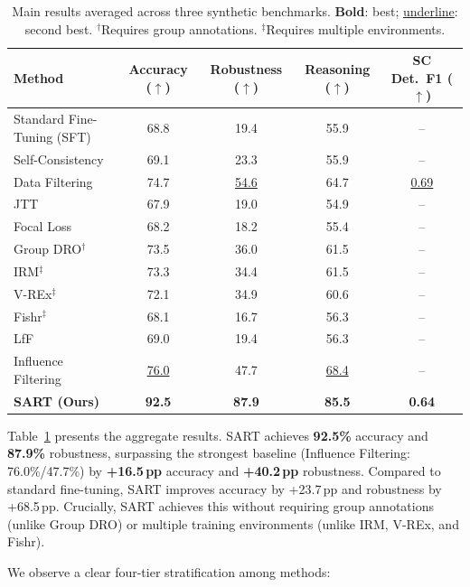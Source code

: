 \begin{table}[t]
\centering
\caption{Main results averaged across three synthetic benchmarks. \textbf{Bold}: best; \underline{underline}: second best. $^\dagger$Requires group annotations. $^\ddagger$Requires multiple environments.}
\label{tab:main_results}
\small
\begin{tabular}{lcccc}
\toprule
\textbf{Method} & \textbf{Accuracy} ($\uparrow$) & \textbf{Robustness} ($\uparrow$) & \textbf{Reasoning} ($\uparrow$) & \textbf{SC Det.\ F1} ($\uparrow$) \\
\midrule
Standard Fine-Tuning (SFT)  & 68.8 & 19.4  & 55.9 & -- \\
Self-Consistency            & 69.1 & 23.3  & 55.9 & -- \\
Data Filtering              & 74.7 & \underline{54.6}  & 64.7 & \underline{0.69} \\
JTT                         & 67.9 & 19.0  & 54.9 & -- \\
Focal Loss                  & 68.2 & 18.2  & 55.4 & -- \\
Group DRO$^\dagger$         & 73.5 & 36.0  & 61.5 & -- \\
IRM$^\ddagger$              & 73.3 & 34.4  & 61.5 & -- \\
V-REx$^\ddagger$            & 72.1 & 34.9  & 60.6 & -- \\
Fishr$^\ddagger$            & 68.1 & 16.7  & 56.3 & -- \\
LfF                         & 69.0 & 19.4  & 56.3 & -- \\
Influence Filtering         & \underline{76.0} & 47.7  & \underline{68.4} & -- \\
\midrule
\textbf{SART (Ours)}        & \textbf{92.5} & \textbf{87.9}  & \textbf{85.5} & \textbf{0.64} \\
\bottomrule
\end{tabular}
\end{table}

Table~\ref{tab:main_results} presents the aggregate results. SART achieves \textbf{92.5\%} accuracy and \textbf{87.9\%} robustness, surpassing the strongest baseline (Influence Filtering: 76.0\%/47.7\%) by \textbf{+16.5\,pp} accuracy and \textbf{+40.2\,pp} robustness. Compared to standard fine-tuning, SART improves accuracy by +23.7\,pp and robustness by +68.5\,pp. Crucially, SART achieves this without requiring group annotations (unlike Group DRO) or multiple training environments (unlike IRM, V-REx, and Fishr).

We observe a clear four-tier stratification among methods:

